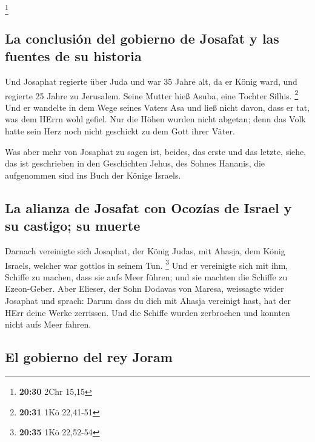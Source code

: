 \footnote{\textbf{20:30} 2Chr 15,15}

\hypertarget{la-conclusiuxf3n-del-gobierno-de-josafat-y-las-fuentes-de-su-historia}{%
\subsection{La conclusión del gobierno de Josafat y las fuentes de su
historia}\label{la-conclusiuxf3n-del-gobierno-de-josafat-y-las-fuentes-de-su-historia}}

 Und Josaphat regierte über Juda und war 35 Jahre alt, da
er König ward, und regierte 25 Jahre zu Jerusalem. Seine Mutter hieß
Asuba, eine Tochter Silhis. \footnote{\textbf{20:31} 1Kö 22,41-51}
 Und er wandelte in dem Wege seines Vaters Asa und ließ
nicht davon, dass er tat, was dem HErrn wohl gefiel.  Nur
die Höhen wurden nicht abgetan; denn das Volk hatte sein Herz noch nicht
geschickt zu dem Gott ihrer Väter.

 Was aber mehr von Josaphat zu sagen ist, beides, das
erste und das letzte, siehe, das ist geschrieben in den Geschichten
Jehus, des Sohnes Hananis, die aufgenommen sind ins Buch der Könige
Israels.

\hypertarget{la-alianza-de-josafat-con-ocozuxedas-de-israel-y-su-castigo-su-muerte}{%
\subsection{La alianza de Josafat con Ocozías de Israel y su castigo; su
muerte}\label{la-alianza-de-josafat-con-ocozuxedas-de-israel-y-su-castigo-su-muerte}}

 Darnach vereinigte sich Josaphat, der König Judas, mit
Ahasja, dem König Israels, welcher war gottlos in seinem Tun.
\footnote{\textbf{20:35} 1Kö 22,52-54}  Und er vereinigte
sich mit ihm, Schiffe zu machen, dass sie aufs Meer führen; und sie
machten die Schiffe zu Ezeon-Geber.  Aber Elieser, der
Sohn Dodavas von Maresa, weissagte wider Josaphat und sprach: Darum dass
du dich mit Ahasja vereinigt hast, hat der HErr deine Werke zerrissen.
Und die Schiffe wurden zerbrochen und konnten nicht aufs Meer fahren.

\hypertarget{el-gobierno-del-rey-joram}{%
\subsection{El gobierno del rey Joram}\label{el-gobierno-del-rey-joram}}

